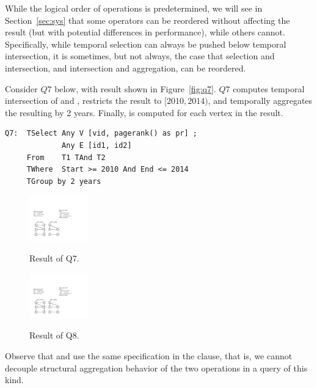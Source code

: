 While the logical order of operations is predetermined, we will see in
Section~\ref{sec:sys} that some operators can be reordered without
affecting the result (but with potential differences in performance),
while others cannot.  Specifically, while temporal selection can
always be pushed below temporal intersection, it is sometimes, but not
always, the case that selection and intersection, and intersection and
aggregation, can be reordered.

Consider $Q7$ below, with result shown in Figure~\ref{fig:q7}. $Q7$
computes temporal intersection of  and , restricts
the result to $[2010, 2014)$, and temporally aggregates the resulting
  \tg by 2 years.  Finally,  is computed for each
  vertex in the result.

\begin{small}
\begin{verbatim}
Q7:  TSelect Any V [vid, pagerank() as pr] ; 
             Any E [id1, id2] 
     From    T1 TAnd T2 
     TWhere  Start >= 2010 And End <= 2014 
     TGroup by 2 years
\end{verbatim}
\end{small}

\begin{figure}
\centering
\begin{minipage}{1.6in}
  \centering
  \includegraphics[width=1in]{figs/q7.pdf}
  \caption{Result of Q7.}{}
  \label{fig:q7}
\end{minipage}%
\begin{minipage}{1.6in}
  \centering
  \includegraphics[width=1in]{figs/q8.pdf}
  \caption{Result of Q8.}{}
  \label{fig:q8}
\end{minipage}
\end{figure}

Observe that  and  use the same
specification in the  clause, that is, we cannot
decouple structural aggregation behavior of the two operations in a
query of this kind.

